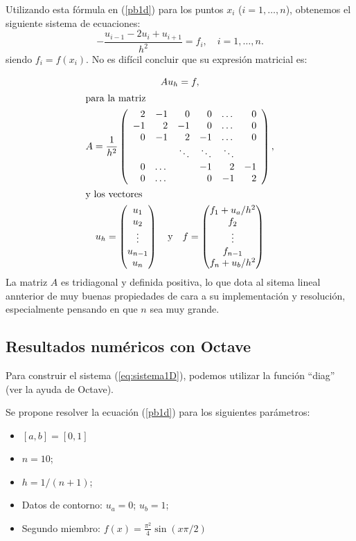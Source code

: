 \documentclass[11pt,spanish]{article}
\begin{document}
Utilizando esta fórmula en (\ref{pb1d}) para los puntos $x_i$
($i=1,\dots,n$), obtenemos el siguiente sistema de ecuaciones:
$$
-\frac{u_{i-1}-2u_i + u_{i+1}}{h^2} = f_i, \quad i=1,\dots,n.
$$
siendo $f_i=f(x_i)$.
No es difícil concluir que su expresión matricial es:

\begin{gather}
Au_h=f,\label{eq:sistema1D} \\
\intertext{para la matriz}
A=\frac{1}{h^2}\left(
\begin{array}{rrrrrr}
   2 & -1 &  0 &  0 & \dots & 0 \\
  -1 &  2 & -1 &  0 & \dots & 0 \\
   0 & -1 &  2 & -1 & \dots & 0 \\
     &    & \ddots & \ddots & \ddots \\
   0 & \dots & & -1 & 2  & -1 \\
   0 & \dots & & 0 & -1 & 2
 \end{array}
\right),
\\
\intertext{y los vectores}
u_h=
\begin{pmatrix}
  u_1 \\ u_2 \\ \vdots \\ u_{n-1} \\ u_n
\end{pmatrix}
%
\quad \mbox{y}  \quad
f=
\begin{pmatrix}
  f_1 + u_a/h^2 \\ f_2 \\ \vdots \\ f_{n-1} \\ f_n+u_b/h^2
\end{pmatrix}
\end{gather}
La matriz $A$ es tridiagonal y definida positiva, lo que dota al
sitema lineal annterior de muy buenas propiedades de cara a su
implementación y resolución, especialmente pensando en que $n$ sea muy
grande.

\subsection{Resultados numéricos con Octave}
Para construir el sistema (\ref{eq:sistema1D}), podemos utilizar la
función ``diag'' (ver la ayuda de Octave).

Se propone resolver la ecuación (\ref{pb1d}) para los siguientes
parámetros:
\begin{itemize}
\item $[a,b]=[0,1]$
\item $n= 10$;
\item $h = 1/(n+1)$;
\item Datos de contorno: $u_a=0$; $u_b=1$;
\item Segundo miembro: $f(x)=\frac{\pi^2}{4}  \sin(x\pi/2)$
\end{itemize}
\end{document}
